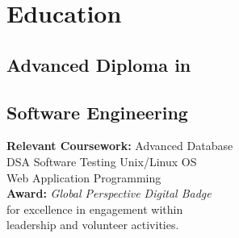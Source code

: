 
\section{Education}
\subsection{Advanced Diploma in}
\subsection{Software Engineering}

{\bf Relevant Coursework:} Advanced Database \\ DSA \textbullet{} Software Testing \textbullet{} Unix/Linux OS \\ Web Application Programming\\
{\bf Award:} \textit{Global Perspective Digital Badge}\\for excellence in engagement within\\leadership and volunteer activities.
